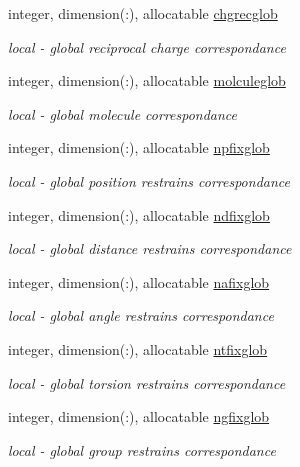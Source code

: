\begin{DoxyCompactItemize}
integer, dimension(\-:), allocatable \hyperlink{classatmlst_aa383c916e50489948eb0f39c2156b4ed}{chgrecglob}
\begin{DoxyCompactList}\small\item\em local -\/ global reciprocal charge correspondance \end{DoxyCompactList}\item 
integer, dimension(\-:), allocatable \hyperlink{classatmlst_ad62b00f425a04aeb43f31558243bf87b}{molculeglob}
\begin{DoxyCompactList}\small\item\em local -\/ global molecule correspondance \end{DoxyCompactList}\item 
integer, dimension(\-:), allocatable \hyperlink{classatmlst_a6efb0a7f8849ad799c89682d66e81b9c}{npfixglob}
\begin{DoxyCompactList}\small\item\em local -\/ global position restrains correspondance \end{DoxyCompactList}\item 
integer, dimension(\-:), allocatable \hyperlink{classatmlst_a935be70be3408495e70f3e1e8cf16469}{ndfixglob}
\begin{DoxyCompactList}\small\item\em local -\/ global distance restrains correspondance \end{DoxyCompactList}\item 
integer, dimension(\-:), allocatable \hyperlink{classatmlst_a6f1fe2ddf10ff4af2dac1d47f65f66e0}{nafixglob}
\begin{DoxyCompactList}\small\item\em local -\/ global angle restrains correspondance \end{DoxyCompactList}\item 
integer, dimension(\-:), allocatable \hyperlink{classatmlst_a8f4e19f6b70e85447e97344a64e5e99c}{ntfixglob}
\begin{DoxyCompactList}\small\item\em local -\/ global torsion restrains correspondance \end{DoxyCompactList}\item 
integer, dimension(\-:), allocatable \hyperlink{classatmlst_a5f17c711f128e6273d752685aee21446}{ngfixglob}
\begin{DoxyCompactList}\small\item\em local -\/ global group restrains correspondance \end{DoxyCompactList}\item 

\end{DoxyCompactItemize}
